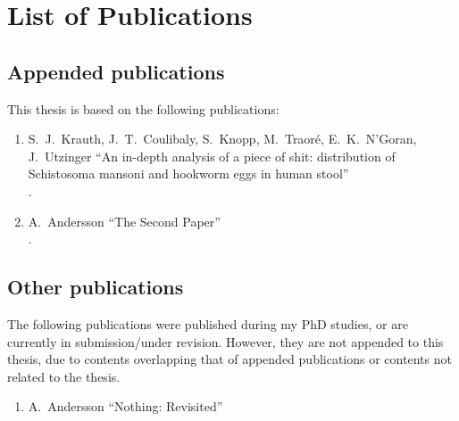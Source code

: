 \chapter*{List of Publications}
\label{A:Papers}

\section*{Appended publications}
This thesis is based on the following publications:
\renewcommand{\labelenumi}{[\Alph{enumi}]}
\begin{enumerate}

\item S.~J.~Krauth, J.~T.~Coulibaly, S.~Knopp, M.~Traor{\'e}, E.~K.~N'Goran, J.~Utzinger
\newblock ``An in-depth analysis of a piece of shit: distribution of Schistosoma mansoni and hookworm eggs in human stool''\\
.

\item A.~Andersson
\newblock ``The Second Paper''\\
.

\end{enumerate}


\newpage
\section*{Other publications}
The following publications were published during my PhD studies, or are currently in submission/under revision.
However, they are not appended to this thesis, due to contents overlapping that of appended publications or contents not related to the thesis.

\renewcommand{\labelenumi}{[\alph{enumi}]}
\begin{enumerate}
 \item A.~Andersson
 \newblock ``Nothing: Revisited''\\
 \end{enumerate}
